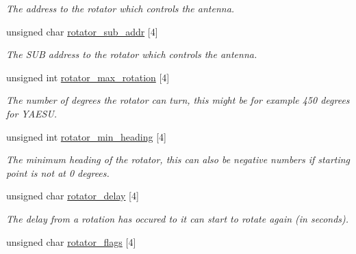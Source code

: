 \begin{CompactItemize}
\begin{CompactList}\small\item\em The address to the rotator which controls the antenna. \item\end{CompactList}\item 
\hypertarget{structstruct__antenna_681b1ad9bb824f0584471598ebc2778c}{
unsigned char \hyperlink{structstruct__antenna_681b1ad9bb824f0584471598ebc2778c}{rotator\_\-sub\_\-addr} \mbox{[}4\mbox{]}}
\label{structstruct__antenna_681b1ad9bb824f0584471598ebc2778c}

\begin{CompactList}\small\item\em The SUB address to the rotator which controls the antenna. \item\end{CompactList}\item 
\hypertarget{structstruct__antenna_f3aaa5838c78010bbac3858d635af260}{
unsigned int \hyperlink{structstruct__antenna_f3aaa5838c78010bbac3858d635af260}{rotator\_\-max\_\-rotation} \mbox{[}4\mbox{]}}
\label{structstruct__antenna_f3aaa5838c78010bbac3858d635af260}

\begin{CompactList}\small\item\em The number of degrees the rotator can turn, this might be for example 450 degrees for YAESU. \item\end{CompactList}\item 
\hypertarget{structstruct__antenna_4d3c87fc3d807091262debcc8329d62d}{
unsigned int \hyperlink{structstruct__antenna_4d3c87fc3d807091262debcc8329d62d}{rotator\_\-min\_\-heading} \mbox{[}4\mbox{]}}
\label{structstruct__antenna_4d3c87fc3d807091262debcc8329d62d}

\begin{CompactList}\small\item\em The minimum heading of the rotator, this can also be negative numbers if starting point is not at 0 degrees. \item\end{CompactList}\item 
\hypertarget{structstruct__antenna_e7bcbf84bbee72d2ea5e023d2796ea68}{
unsigned char \hyperlink{structstruct__antenna_e7bcbf84bbee72d2ea5e023d2796ea68}{rotator\_\-delay} \mbox{[}4\mbox{]}}
\label{structstruct__antenna_e7bcbf84bbee72d2ea5e023d2796ea68}

\begin{CompactList}\small\item\em The delay from a rotation has occured to it can start to rotate again (in seconds). \item\end{CompactList}\item 
\hypertarget{structstruct__antenna_3dc5ccac79d4cea9efdad72801dd3fca}{
unsigned char \hyperlink{structstruct__antenna_3dc5ccac79d4cea9efdad72801dd3fca}{rotator\_\-flags} \mbox{[}4\mbox{]}}
\label{structstruct__antenna_3dc5ccac79d4cea9efdad72801dd3fca}


\end{CompactItemize}
